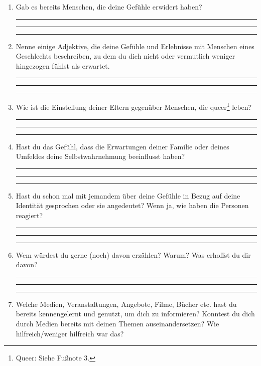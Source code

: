 \documentclass[a4paper,12pt]{article}
\begin{document}
\begin{enumerate}[label=--]
    \item Gab es bereits Menschen, die deine Gefühle erwidert haben?  

    \rule{12cm}{0.2pt}
    
    \rule{12cm}{0.2pt}
    
    \rule{12cm}{0.2pt}
    \item Nenne einige Adjektive, die deine Gefühle und Erlebnisse mit Menschen eines Geschlechts beschreiben, zu dem du dich nicht oder vermutlich weniger hingezogen fühlst als erwartet.  
      
    \rule{12cm}{0.2pt}
    
    \rule{12cm}{0.2pt}
    
    \rule{12cm}{0.2pt}
    
    \item Wie ist die Einstellung deiner Eltern gegenüber Menschen, die queer\footnote{Queer: Siehe Fußnote 3.} leben?  

    \rule{12cm}{0.2pt}
    
    \rule{12cm}{0.2pt}

    \rule{12cm}{0.2pt}
    
    \item Hast du das Gefühl, dass die Erwartungen deiner Familie oder deines Umfeldes deine Selbstwahrnehmung beeinflusst haben?  
   
    \rule{12cm}{0.2pt}
    
    \rule{12cm}{0.2pt}
    
    \rule{12cm}{0.2pt}
    
    \item Hast du schon mal mit jemandem über deine Gefühle in Bezug auf deine Identität gesprochen oder sie angedeutet? Wenn ja, wie haben die Personen reagiert?  
    
    \rule{12cm}{0.2pt}
    
    \rule{12cm}{0.2pt}
    
    \rule{12cm}{0.2pt}

    \item Wem würdest du gerne (noch) davon erzählen? Warum? Was erhoffst du dir davon?  

    \rule{12cm}{0.2pt}

    \rule{12cm}{0.2pt}
    
    \rule{12cm}{0.2pt}
    
    \item Welche Medien, Veranstaltungen, Angebote, Filme, Bücher etc. hast du bereits kennengelernt und genutzt, um dich zu informieren? Konntest du dich durch Medien bereits mit deinen Themen auseinandersetzen? Wie hilfreich/weniger hilfreich war das?  
    

\end{enumerate}
\end{document}
